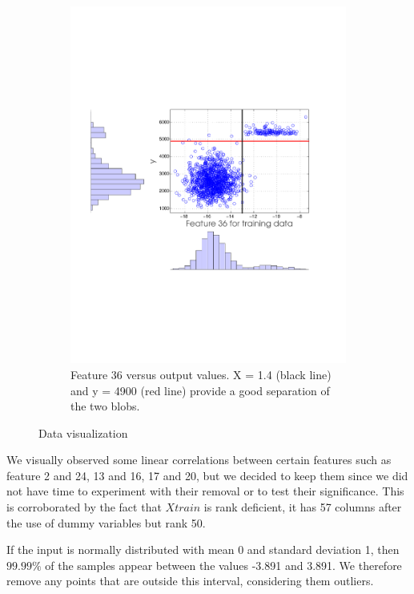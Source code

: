 \begin{figure}[ht]
\begin{subfigure}[b]{0.45\textwidth}
    \includegraphics[width=\textwidth]{figures/feature36_13_crop.pdf}
    \caption{Feature 36 versus output values. X = 1.4 (black line) and y = 4900 (red line)  provide a good separation of the two blobs.}
    \label{fig:feature36}
  \end{subfigure}
  \caption{Data visualization}
\end{figure}

We visually observed some linear correlations between certain features such as feature 2 and 24, 13 and 16, 17 and 20, but we decided to keep them since we did not have time to experiment with their removal or to test their significance. This is corroborated by the fact that $Xtrain$ is rank deficient, it has 57 columns after the use of dummy variables but rank 50.

If the input is normally distributed with mean 0 and standard deviation 1, then
 $99.99\%$ of the samples appear between the values -3.891 and 3.891. We therefore remove any points that are outside this interval, considering them outliers.


